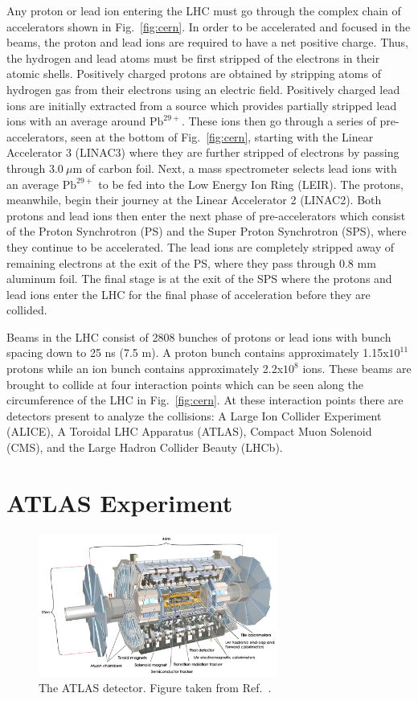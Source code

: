 Any proton or lead ion entering the LHC must go through the complex chain of accelerators shown in  Fig.~\ref{fig:cern}. In order to be accelerated and focused in the beams, the proton and lead ions are required to have a net positive charge. Thus, the hydrogen and lead atoms must be first stripped of the electrons in their atomic shells. Positively charged protons are obtained by stripping atoms of hydrogen gas from their electrons using an electric field. Positively charged lead ions are initially extracted from a source which provides partially stripped lead ions with an average around $\mathrm{Pb^{29+}}$. These ions then go through a series of pre-accelerators, seen at the bottom of Fig.~\ref{fig:cern}, starting with the Linear Accelerator 3 (LINAC3) where they are further stripped of electrons by passing through $3.0\ \mu$m  of carbon foil. Next, a mass spectrometer selects lead ions with an average $\mathrm{Pb^{29+}}$ to be fed into the Low Energy Ion Ring (LEIR). The protons, meanwhile, begin their journey at the Linear Accelerator 2 (LINAC2). Both protons and lead ions then enter the next phase of pre-accelerators which consist of the Proton Synchrotron (PS) and the Super Proton Synchrotron (SPS), where they continue to be  accelerated. The lead ions are completely stripped away of remaining electrons at the exit of the PS, where they pass through 0.8 mm aluminum foil. The final stage is at the exit of the SPS where the protons and lead ions enter the LHC for the final phase of acceleration before they are collided.
 
Beams in the LHC consist of 2808 bunches of protons or lead ions with bunch spacing down to 25 ns (7.5 m). A proton bunch contains approximately 1.15x$10^{11}$ protons while an ion bunch contains approximately 2.2x$10^{8}$ ions. These beams are brought to collide at four interaction points which can be seen along the circumference of the LHC in Fig.~\ref{fig:cern}. At these interaction points there are detectors present to analyze the collisions: A Large Ion Collider Experiment (ALICE), A Toroidal LHC Apparatus (ATLAS), Compact Muon Solenoid (CMS), and the Large Hadron Collider Beauty (LHCb).

\section{ATLAS Experiment}


\begin{figure}[ht]
	\centering
	\includegraphics[width=0.7\textwidth]{figures/atlas.pdf} %
	\caption{The ATLAS detector. Figure taken from Ref.~\cite{Aad:2008zzm}.}	
	\label{fig:atlas}%
\end{figure}

